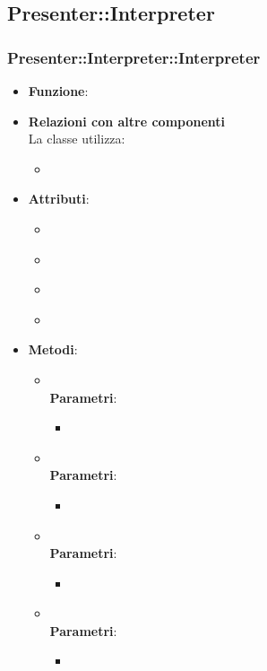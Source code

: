 \subsection{Presenter::Interpreter}
\subsubsection{Presenter::Interpreter::Interpreter}
\begin{itemize}
\item\textbf{Funzione}:
\item\textbf{Relazioni con altre componenti}\\
La classe utilizza:
	\begin{itemize}
		\item
	\end{itemize}
\item\textbf{Attributi}:
	\begin{itemize}
		\item\code{}\\
		\item\code{}\\
		\item\code{}\\
		\item\code{}\\
	\end{itemize}
\item\textbf{Metodi}:
	\begin{itemize}
		\item\code{}\\
		\textbf{Parametri}:
			\begin{itemize}
				\item\code{}\\
			\end{itemize}
		\item\code{}\\
		\textbf{Parametri}:
			\begin{itemize}
				\item\code{}\\
			\end{itemize}
		\item\code{}\\
		\textbf{Parametri}:
			\begin{itemize}
				\item\code{}\\
			\end{itemize}
		\item\code{}\\
		\textbf{Parametri}:
			\begin{itemize}
				\item\code{}\\
			\end{itemize}
	\end{itemize}
\end{itemize}

